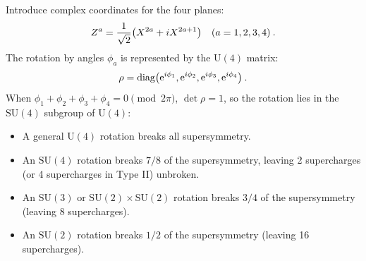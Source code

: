 Introduce complex coordinates for the four planes:
\begin{equation}
	Z^a = \frac{1}{\sqrt{2}}\bigl(X^{2a} + i X^{2a+1}\bigr) \quad (a=1,2,3,4) \:.
\end{equation}
The rotation by angles $\phi_a$ is represented by the $\mathrm{U}(4)$ matrix:
\begin{equation}
	\rho = \operatorname{diag}\bigl(\mathrm{e}^{i\phi_1}, \mathrm{e}^{i\phi_2}, \mathrm{e}^{i\phi_3}, \mathrm{e}^{i\phi_4}\bigr) \:. \label{13.4.12}
\end{equation}
When $\phi_1 + \phi_2 + \phi_3 + \phi_4 = 0 \pmod{2\pi}$, $\det\rho = 1$, so the rotation lies in the $\mathrm{SU}(4)$ subgroup of $\mathrm{U}(4)$:
\begin{itemize}
	\item A general $\mathrm{U}(4)$ rotation breaks all supersymmetry.
	\item An $\mathrm{SU}(4)$ rotation breaks $7/8$ of the supersymmetry, leaving 2 supercharges (or 4 supercharges in Type II) unbroken.
	\item An $\mathrm{SU}(3)$ or $\mathrm{SU}(2)\times\mathrm{SU}(2)$ rotation breaks $3/4$ of the supersymmetry (leaving 8 supercharges).
	\item An $\mathrm{SU}(2)$ rotation breaks $1/2$ of the supersymmetry (leaving 16 supercharges).
\end{itemize}
